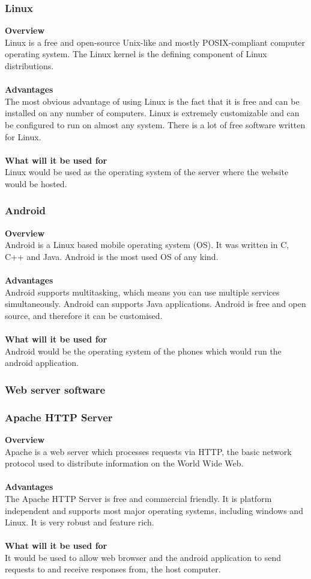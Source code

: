 \documentclass{article}
\begin{document}
\subsubsection*{Linux}
\textbf{Overview}\\
Linux is a free and open-source Unix-like and mostly POSIX-compliant computer operating system. The Linux kernel is the defining component of Linux distributions. \\\\
\textbf{Advantages}\\
The most obvious advantage of using Linux is the fact that it is free and can be installed on any number of computers. Linux is extremely customizable and can be configured to run on almost any system. There is a lot of free software written for Linux. \\\\
\textbf{What will it be used for}\\
Linux would be used as the operating system of the server where the website would be hosted.

\subsubsection*{Android}
\textbf{Overview}\\
Android is a Linux based mobile operating system (OS). It was written in C, C++ and Java. Android is the most used OS of any kind. \\\\
\textbf{Advantages}\\
Android supports multitasking, which means you can use multiple services simultaneously. Android can supports Java applications. Android is free and open source, and therefore it can be customised. \\\\
\textbf{What will it be used for}\\
Android would be the operating system of the phones which would run the android application.

\subsubsection{Web server software}
\subsubsection*{Apache HTTP Server}
\textbf{Overview}\\
Apache is a web server which processes requests via HTTP, the basic network protocol used to distribute information on the World Wide Web.\\\\
\textbf{Advantages}\\
The Apache HTTP Server is free and commercial friendly. It is platform independent and supports most major operating systems, including windows and Linux. It is very robust and feature rich.\\\\
\textbf{What will it be used for}\\
It would be used to allow web browser and the android application to send requests to and receive responses from, the host computer. 
\end{document}
